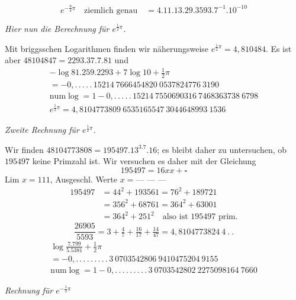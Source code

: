 \[
e^{-\frac94\pi}\quad\text{ziemlich genau}\quad=4.11.13.29.3593.7^{-1}.10^{-10}
\]

\begin{center}\emph{Hier nun die Berechnung für $e^{\frac12\pi}$.}\end{center}

Mit briggsschen Logarithmen finden wir näherungsweise $e^{\frac12\pi}=4{,}810484$.
Es ist aber $48104847=2293.37.7.81$ und
\[
\begin{gathered}
-\log81.259.2293+7\log10+\tfrac12\pi\\[5pt]=-0{,}.\,.\,.\,.\,.\,15214\ 7666454820\ 0537824776\ 3190\\[5pt]
\mathrm{num}\log=1-0{,}.\,.\,.\,.\,.\,15214\ 7550690316\ 7468363738\ 6798\\[5pt]
e^{\frac12\pi}=4{,}8104773809\ 6535165547\ 3044648993\ 1536
\end{gathered}
\]

\par{}

\begin{center}\emph{Zweite Rechnung für $e^{\frac12\pi}$.}\end{center}

Wir finden $48104773808=195497.13^3.7.16$; es bleibt daher zu untersuchen, ob $195497$ keine Primzahl ist.
Wir versuchen es daher mit der Gleichung
\[
195497=16xx+\square
\]
Lim $x=111$, Ausgeschl. Werte $x=\text{---\ ---\ ---}$
\[
\begin{aligned}
195497&=44^2+193561=76^2+189721\\[6pt]&=356^2+68761=364^2+63001\\[5pt]
&=364^2+251^2\quad\text{also ist }195497\text{ prim.}
\end{aligned}
\]
\[
\frac{26905}{5593}=3+\tfrac47+\tfrac{16}{17}+\tfrac{14}{47}=4{,}8104773824\ 4\ .\ .
\]
\[
\begin{gathered}
\log\frac{7.799}{5.5381}+\tfrac12\pi\\[5pt]=-0{,}.\,.\,.\,.\,.\,.\,.\,.\,.\,3\ 0703542806\ 9410475204\ 9155\\[5pt]
\mathrm{num}\log=1-0{,}.\,.\,.\,.\,.\,.\,.\,.\,.\,3\ 0703542802\ 2275098164\ 7660
\end{gathered}
\]

\begin{center}\emph{Rechnung für $e^{-\frac12\pi}$}\end{center}

